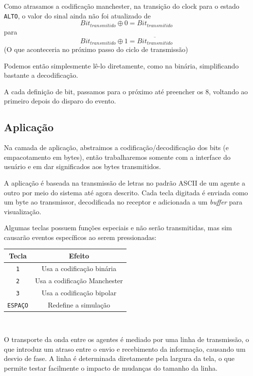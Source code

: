 \documentclass[titlepage,twocolumn]{article}
\begin{document}
Como atrasamos a codificação manchester, na transição do clock para o estado \texttt{ALTO}, o valor do sinal ainda não foi atualizado de
\[Bit_{transmitido} \oplus 0 = Bit_{transmitido}\] para
\[Bit_{transmitido} \oplus 1 = \overline{Bit_{transmitido}}\]
(O que aconteceria no próximo passo do ciclo de transmissão)

Podemos então simplesmente lê-lo diretamente, como na binária, simplificando bastante a decodificação.

A cada definição de bit, passamos para o próximo até preencher os 8, voltando ao primeiro depois do disparo do evento.

\subsection{Aplicação}

Na camada de aplicação, abstraimos a codifica\-ção/de\-codificação dos bits (e empacotamento em bytes), então trabalharemos somente com a interface do usuário e em dar significados aos bytes transmitidos.

A aplicação é baseada na transmissão de letras no padrão ASCII de um agente a outro por meio do sistema até agora descrito. Cada tecla digitada é enviada como um byte ao transmissor, decodificada no receptor e adicionada a um \textit{buffer} para visualização.

Algumas teclas possuem funções especiais e não serão transmitidas, mas sim causarão eventos específicos ao serem pressionadas:

\begin{center}
    \begin{tabular}{|c | c |}
        \hline
        Tecla & Efeito\\
        \hline
        \texttt{1} & Usa a codificação binária\\
        \texttt{2} & Usa a codificação Manchester\\
        \texttt{3} & Usa a codificação bipolar\\
        \texttt{ESPAÇO} & Redefine a simulação\\
        \hline
    \end{tabular}\\
\end{center}

O transporte da onda entre os agentes é mediado por uma linha de transmissão, o que introduz um atraso entre o envio e recebimento da informação, causando um desvio de fase. A linha é determinada diretamente pela largura da tela, o que permite testar facilmente o impacto de mudanças do tamanho da linha.
\end{document}
